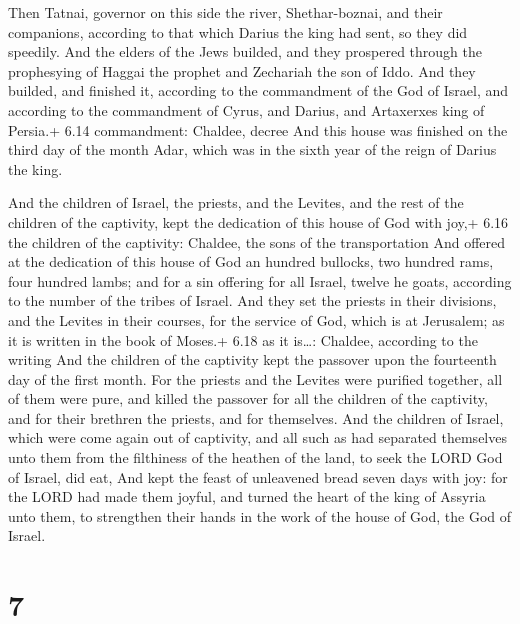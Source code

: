  Then Tatnai, governor on this side the river,
Shethar-boznai, and their companions, according to that which Darius the
king had sent, so they did speedily.  And the elders of the
Jews builded, and they prospered through the prophesying of Haggai the
prophet and Zechariah the son of Iddo. And they builded, and finished
it, according to the commandment of the God of Israel, and according to
the commandment of Cyrus, and Darius, and Artaxerxes king of Persia.+
6.14 commandment: Chaldee, decree  And this house was
finished on the third day of the month Adar, which was in the sixth year
of the reign of Darius the king.

 And the children of Israel, the priests, and the
Levites, and the rest of the children of the captivity, kept the
dedication of this house of God with joy,+ 6.16 the children of the
captivity: Chaldee, the sons of the transportation  And
offered at the dedication of this house of God an hundred bullocks, two
hundred rams, four hundred lambs; and for a sin offering for all Israel,
twelve he goats, according to the number of the tribes of Israel.
 And they set the priests in their divisions, and the
Levites in their courses, for the service of God, which is at Jerusalem;
as it is written in the book of Moses.+ 6.18 as it is\ldots: Chaldee,
according to the writing  And the children of the captivity
kept the passover upon the fourteenth day of the first month.
 For the priests and the Levites were purified together,
all of them were pure, and killed the passover for all the children of
the captivity, and for their brethren the priests, and for themselves.
 And the children of Israel, which were come again out of
captivity, and all such as had separated themselves unto them from the
filthiness of the heathen of the land, to seek the LORD God of Israel,
did eat,  And kept the feast of unleavened bread seven days
with joy: for the LORD had made them joyful, and turned the heart of the
king of Assyria unto them, to strengthen their hands in the work of the
house of God, the God of Israel.

\hypertarget{section-6}{%
\section{7}\label{section-6}}

